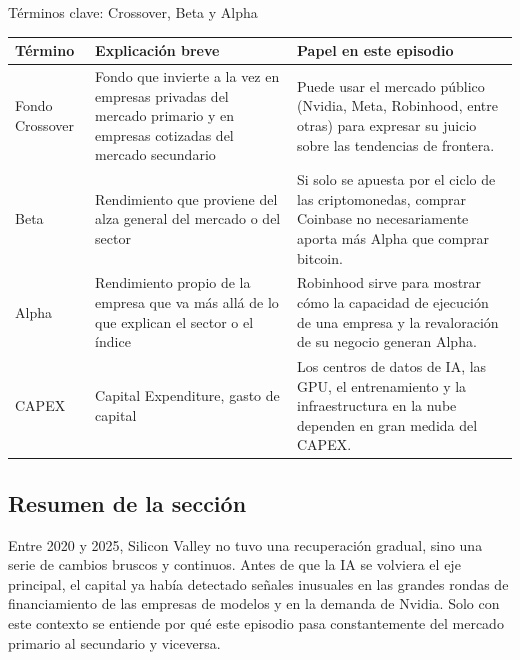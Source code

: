 \begin{knowledgebox}{Términos clave: Crossover, Beta y Alpha}
\begin{tabularx}{\textwidth}{p{}p{}X}
\toprule
Término & Explicación breve & Papel en este episodio \\
\midrule
Fondo Crossover & Fondo que invierte a la vez en empresas privadas del mercado primario y en empresas cotizadas del mercado secundario & Puede usar el mercado público (Nvidia, Meta, Robinhood, entre otras) para expresar su juicio sobre las tendencias de frontera. \\
Beta & Rendimiento que proviene del alza general del mercado o del sector & Si solo se apuesta por el ciclo de las criptomonedas, comprar Coinbase no necesariamente aporta más Alpha que comprar bitcoin. \\
Alpha & Rendimiento propio de la empresa que va más allá de lo que explican el sector o el índice & Robinhood sirve para mostrar cómo la capacidad de ejecución de una empresa y la revaloración de su negocio generan Alpha. \\
CAPEX & Capital Expenditure, gasto de capital & Los centros de datos de IA, las GPU, el entrenamiento y la infraestructura en la nube dependen en gran medida del CAPEX. \\
\bottomrule
\end{tabularx}
\end{knowledgebox}

\subsection{Resumen de la sección}

Entre 2020 y 2025, Silicon Valley no tuvo una recuperación gradual, sino una serie de cambios bruscos y continuos. Antes de que la IA se volviera el eje principal, el capital ya había detectado señales inusuales en las grandes rondas de financiamiento de las empresas de modelos y en la demanda de Nvidia. Solo con este contexto se entiende por qué este episodio pasa constantemente del mercado primario al secundario y viceversa.
